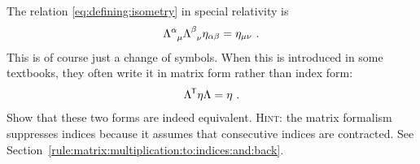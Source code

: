 \begin{exercise}
\label{ex:lorentz:definition:indices}
The relation \eqref{eq:defining:isometry} in special relativity is
\begin{align}
    \Lambda\aij{\alpha}{\mu} \Lambda\aij{\beta}{\nu} \eta_{\alpha\beta} = \eta_{\mu\nu} \ .
\end{align}
This is of course just a change of symbols. When this is introduced in some textbooks, they often write it in matrix form rather than index form:
\begin{align}
    \Lambda^{\mkern-1.5mu\mathsf{T}} \eta \Lambda = \eta \ .
\end{align}
Show that these two forms are indeed equivalent. \textsc{Hint}: the matrix formalism suppresses indices because it assumes that consecutive indices are contracted. See Section~\ref{rule:matrix:multiplication:to:indices:and:back}.
\end{exercise}
% 
